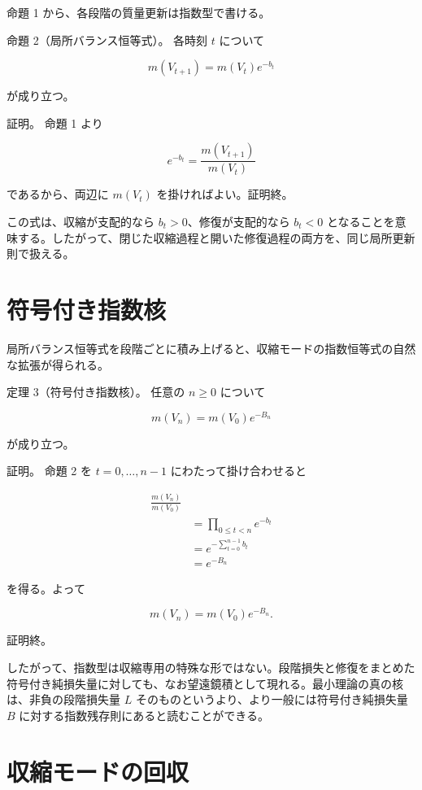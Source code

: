 \documentclass[12pt,a4paper]{article}
\begin{document}
命題 1 から、各段階の質量更新は指数型で書ける。

命題 2（局所バランス恒等式）。 各時刻 \(t\) について

\[
m(V_{t+1}) = m(V_{t}) e^{-b_{t}}
\]

が成り立つ。

証明。 命題 1 より

\[
e^{-b_{t}} = \frac{m(V_{t+1})}{m(V_{t})}
\]

であるから、両辺に \(m(V_{t})\) を掛ければよい。証明終。

この式は、収縮が支配的なら \(b_{t} > 0\)、修復が支配的なら \(b_{t} < 0\) となることを意味する。したがって、閉じた収縮過程と開いた修復過程の両方を、同じ局所更新則で扱える。

\section{符号付き指数核}\label{ux7b26ux53f7ux4ed8ux304dux6307ux6570ux6838}

局所バランス恒等式を段階ごとに積み上げると、収縮モードの指数恒等式の自然な拡張が得られる。

定理 3（符号付き指数核）。 任意の \(n \ge 0\) について

\[
m(V_{n}) = m(V_0) e^{-B_{n}}
\]

が成り立つ。

証明。 命題 2 を \(t=0,\dots,n-1\) にわたって掛け合わせると

\[
\begin{aligned}
\frac{m(V_{n})}{m(V_0)} \\
&= \prod_{0\le t<n} e^{-b_{t}} \\
&= e^{-\sum_{t=0}^{n-1} b_{t}} \\
&= e^{-B_{n}}
\end{aligned}
\]

を得る。よって

\[
m(V_{n}) = m(V_0) e^{-B_{n}}.
\]

証明終。

したがって、指数型は収縮専用の特殊な形ではない。段階損失と修復をまとめた符号付き純損失量に対しても、なお望遠鏡積として現れる。最小理論の真の核は、非負の段階損失量 \(L\) そのものというより、より一般には符号付き純損失量 \(B\) に対する指数残存則にあると読むことができる。

\section{収縮モードの回収}\label{ux53ceux7e2eux30e2ux30fcux30c9ux306eux56deux53ce}
\end{document}
